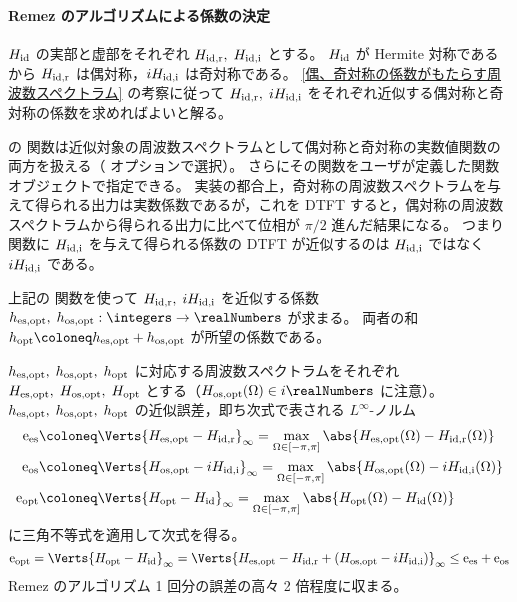             \paragraph{Remez のアルゴリズムによる係数の決定}
                \label{Remez のアルゴリズムによる係数の決定}
                $H_{\text{id}}$ の実部と虚部をそれぞれ $H_{\text{id,r}},\;H_{\text{id,i}}$ とする。
                $H_{\text{id}}$ が Hermite 対称であるから $H_{\text{id,r}}$ は偶対称，$iH_{\text{id,i}}$ は奇対称である。
                \ref{偶、奇対称の係数がもたらす周波数スペクトラム} の考察に従って $H_{\text{id,r}},\;iH_{\text{id,i}}$ をそれぞれ近似する偶対称と奇対称の係数を求めればよいと解る。
                \par
                \cite{DSP_JL} の  関数は近似対象の周波数スペクトラムとして偶対称と奇対称の実数値関数の両方を扱える（ オプションで選択）。
                さらにその関数をユーザが定義した関数オブジェクトで指定できる。
                実装の都合上，奇対称の周波数スペクトラムを与えて得られる出力は実数係数であるが，これを DTFT すると，偶対称の周波数スペクトラムから得られる出力に比べて位相が $\pi/2$ 進んだ結果になる。
                つまり  関数に $H_{\text{id,i}}$ を与えて得られる係数の DTFT が近似するのは $H_{\text{id,i}}$ ではなく $iH_{\text{id,i}}$ である。
                \par
                上記の  関数を使って $H_{\text{id,r}},\;iH_{\text{id,i}}$ を近似する係数 $\hesOpt,\;\hosOpt:\integers\to\realNumbers$ が求まる。
                両者の和 $\hopt \coloneq \hesOpt + \hosOpt$ が所望の係数である。
                \par
                $h_{\text{es,opt}},\;h_{\text{os,opt}},\;h_{\text{opt}}$ に対応する周波数スペクトラムをそれぞれ $H_{\text{es,opt}},\;H_{\text{os,opt}},\;H_{\text{opt}}$ とする（$\HosOpt(\Omega)\in i\realNumbers$ に注意）。
                $h_{\text{es,opt}},\;h_{\text{os,opt}},\;h_{\text{opt}}$ の近似誤差，即ち次式で表される $L^\infty$-ノルム
                \begin{align*}
                    \eEs &\coloneq \Verts{\HesOpt - \HidR}_\infty = \max_{\Omega\in[-\pi,\pi]}\abs{\HesOpt(\Omega) - \HidR(\Omega)} \\
                    \eOs &\coloneq \Verts{\HosOpt - i\HidI}_\infty = \max_{\Omega\in[-\pi,\pi]}\abs{\HosOpt(\Omega) - i\HidI(\Omega)} \\
                    \eOpt &\coloneq \Verts{\Hopt - \Hid}_\infty = \max_{\Omega\in[-\pi,\pi]}\abs{\Hopt(\Omega ) -\Hid(\Omega)}
                \end{align*}
                に三角不等式を適用して次式を得る。
                \[ \eOpt = \Verts{\Hopt - \Hid}_\infty = \Verts{\HesOpt - \HidR + (\HosOpt - i\HidI)}_\infty \leq \eEs + \eOs \]
                Remez のアルゴリズム 1 回分の誤差の高々 2 倍程度に収まる。

